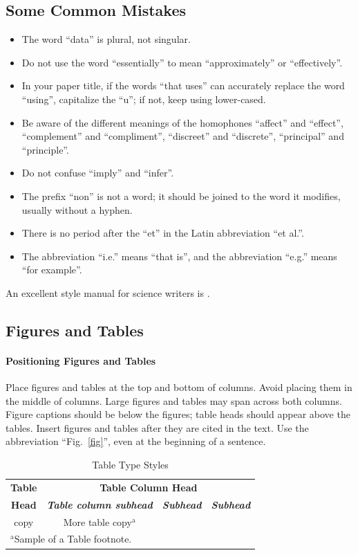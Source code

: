 \documentclass[conference]{IEEEtran}
\begin{document}
\subsection{Some Common Mistakes}\label{SCM}
\begin{itemize}
\item The word ``data'' is plural, not singular.
\item Do not use the word ``essentially'' to mean ``approximately'' or ``effectively''.
\item In your paper title, if the words ``that uses'' can accurately replace the word ``using'', capitalize the ``u''; if not, keep using lower-cased.
\item Be aware of the different meanings of the homophones ``affect'' and ``effect'', ``complement'' and ``compliment'', ``discreet'' and ``discrete'', ``principal'' and ``principle''.
\item Do not confuse ``imply'' and ``infer''.
\item The prefix ``non'' is not a word; it should be joined to the word it modifies, usually without a hyphen.
\item There is no period after the ``et'' in the Latin abbreviation ``et al.''.
\item The abbreviation ``i.e.'' means ``that is'', and the abbreviation ``e.g.'' means ``for example''.
\end{itemize}
An excellent style manual for science writers is \cite{b7}.


\subsection{Figures and Tables}
\paragraph{Positioning Figures and Tables} Place figures and tables at the top and 
bottom of columns. Avoid placing them in the middle of columns. Large 
figures and tables may span across both columns. Figure captions should be 
below the figures; table heads should appear above the tables. Insert 
figures and tables after they are cited in the text. Use the abbreviation 
``Fig.~\ref{fig}'', even at the beginning of a sentence.

\begin{table}[htbp]
\caption{Table Type Styles}
\begin{center}
\begin{tabular}{|c|c|c|c|}
\hline
\textbf{Table}&\multicolumn{3}{|c|}{\textbf{Table Column Head}} \\
\cline{2-4} 
\textbf{Head} & \textbf{\textit{Table column subhead}}& \textbf{\textit{Subhead}}& \textbf{\textit{Subhead}} \\
\hline
copy& More table copy$^{\mathrm{a}}$& &  \\
\hline
\multicolumn{4}{l}{$^{\mathrm{a}}$Sample of a Table footnote.}
\end{tabular}
\label{tab1}
\end{center}
\end{table}
\end{document}
